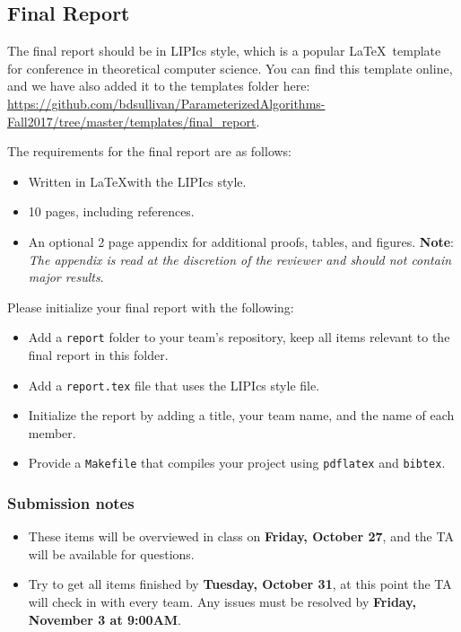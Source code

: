 \documentclass{article}
\begin{document}
\subsection*{Final Report}
The final report should be in LIPIcs style, which is a popular \LaTeX ~template for conference in theoretical computer science. You can find this template online, and we have also added it to the templates folder here: \url{https://github.com/bdsullivan/ParameterizedAlgorithms-Fall2017/tree/master/templates/final_report}.

The requirements for the final report are as follows:
\begin{itemize}
\item Written in \LaTeX with the LIPIcs style.
\item 10 pages, including references.
\item An optional 2 page appendix for additional proofs, tables, and figures. \textbf{Note}: \emph{The appendix is read at the discretion of the reviewer and should not contain major results}.
\end{itemize}

\newpage
Please initialize your final report with the following:
\begin{itemize}
\item Add a \texttt{report} folder to your team's repository, keep all items relevant to the final report in this folder.
\item Add a \texttt{report.tex} file that uses the LIPIcs style file.
\item Initialize the report by adding a title, your team name, and the name of each member.
\item Provide a \texttt{Makefile} that compiles your project using \texttt{pdflatex} and \texttt{bibtex}.
\end{itemize}

\subsubsection*{Submission notes}
\begin{itemize}
\item These items will be overviewed in class on \textbf{Friday, October 27}, and the TA will be available for questions.
\item Try to get all items finished by \textbf{Tuesday, October 31}, at this point the TA will check in with every team. Any issues must be resolved by \textbf{Friday, November 3 at 9:00AM}.
\end{itemize}
\end{document}
